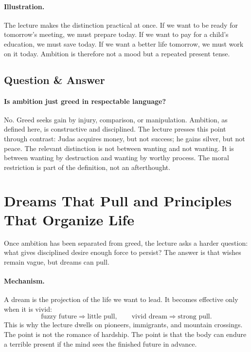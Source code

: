 \paragraph{Illustration.}
The lecture makes the distinction practical at once. If we want to be ready for tomorrow's meeting, we must prepare today. If we want to pay for a child's education, we must save today. If we want a better life tomorrow, we must work on it today. Ambition is therefore not a mood but a repeated present tense.

\subsection{Question \& Answer}

\paragraph{Is ambition just greed in respectable language?}
No. Greed seeks gain by injury, comparison, or manipulation. Ambition, as defined here, is constructive and disciplined. The lecture presses this point through contrast: Judas acquires money, but not success; he gains silver, but not peace. The relevant distinction is not between wanting and not wanting. It is between wanting by destruction and wanting by worthy process. The moral restriction is part of the definition, not an afterthought.

\section{Dreams That Pull and Principles That Organize Life}

Once ambition has been separated from greed, the lecture asks a harder question: what gives disciplined desire enough force to persist? The answer is that wishes remain vague, but dreams can pull.

\paragraph{Mechanism.}
A dream is the projection of the life we want to lead. It becomes effective only when it is vivid:
\begin{equation}
\text{fuzzy future} \Rightarrow \text{little pull}, \qquad
\text{vivid dream} \Rightarrow \text{strong pull}.
\end{equation}
This is why the lecture dwells on pioneers, immigrants, and mountain crossings. The point is not the romance of hardship. The point is that the body can endure a terrible present if the mind sees the finished future in advance.

